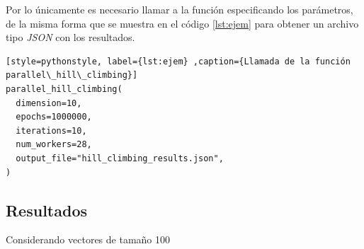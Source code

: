 \documentclass[12pt,twoside]{article}
\begin{document}
Por lo únicamente es necesario llamar a la función especificando los parámetros, de la misma forma que se muestra en el código \ref{lst:ejem} para obtener un archivo tipo \textit{JSON} con los resultados.

\begin{lstlisting}[style=pythonstyle, label={lst:ejem} ,caption={Llamada de la función parallel\_hill\_climbing}]
parallel_hill_climbing(
  dimension=10,                        
  epochs=1000000,             
  iterations=10,                     
  num_workers=28,          
  output_file="hill_climbing_results.json", 
)
\end{lstlisting}

\subsection{Resultados}

Considerando vectores de tamaño 100



	\clearpage
	
	
\end{document}

